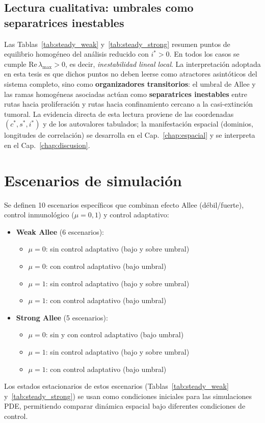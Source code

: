 \subsection{Lectura cualitativa: umbrales como separatrices inestables}
Las Tablas~\ref{tab:steady_weak} y~\ref{tab:steady_strong} resumen puntos de equilibrio homogéneo del análisis reducido con $i^*>0$. En todos los casos se cumple $\mathrm{Re}\,\lambda_{\max}>0$, es decir, \emph{inestabilidad lineal local}. La interpretación adoptada en esta tesis es que dichos puntos no deben leerse como atractores asintóticos del sistema completo, sino como \textbf{organizadores transitorios}: el umbral de Allee y las ramas homogéneas asociadas actúan como \textbf{separatrices inestables} entre rutas hacia proliferación y rutas hacia confinamiento cercano a la casi-extinción tumoral. La evidencia directa de esta lectura proviene de las coordenadas $(c^*,s^*,i^*)$ y de los autovalores tabulados; la manifestación espacial (dominios, longitudes de correlación) se desarrolla en el Cap.~\ref{chap:espacial} y se interpreta en el Cap.~\ref{chap:discusion}.

\section{Escenarios de simulación}
Se definen 10 escenarios específicos que combinan efecto Allee (débil/fuerte), control inmunológico ($\mu=0,1$) y control adaptativo:
\begin{itemize}
  \item \textbf{Weak Allee} (6 escenarios): 
    \begin{itemize}
      \item $\mu=0$: sin control adaptativo (bajo y sobre umbral)
      \item $\mu=0$: con control adaptativo (bajo umbral)
      \item $\mu=1$: sin control adaptativo (bajo y sobre umbral)
      \item $\mu=1$: con control adaptativo (bajo umbral)
    \end{itemize}
  \item \textbf{Strong Allee} (5 escenarios):
    \begin{itemize}
      \item $\mu=0$: sin y con control adaptativo (bajo umbral)
      \item $\mu=1$: sin control adaptativo (bajo y sobre umbral)
      \item $\mu=1$: con control adaptativo (bajo umbral)
    \end{itemize}
\end{itemize}
Los estados estacionarios de estos escenarios (Tablas~\ref{tab:steady_weak} y~\ref{tab:steady_strong}) se usan como condiciones iniciales para las simulaciones PDE, permitiendo comparar dinámica espacial bajo diferentes condiciones de control.

